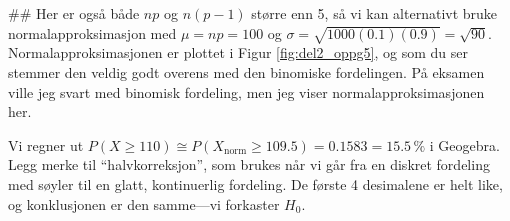 \begin{easylist}[enumerate]
	## Her er også både $np$ og $n(p-1)$ større enn 5, så vi kan alternativt bruke
	normalapproksimasjon med $\mu =np=100$ og $\sigma = \sqrt{1000 (0.1) (0.9)} = \sqrt{90}$. Normalapproksimasjonen er plottet i Figur \ref{fig:del2_oppg5}, og som du ser stemmer den veldig godt overens
	med den binomiske fordelingen.
	På eksamen ville jeg svart med binomisk fordeling, men jeg viser normalapproksimasjonen her.
	
	Vi regner ut $P(X \geq 110) \cong P(X_\text{norm} \geq 109.5) = 0.1583 = 15.5\,  \%$ i Geogebra. Legg merke til ``halvkorreksjon'', som brukes når vi går fra en diskret fordeling med søyler til en glatt, kontinuerlig fordeling. De første 4 desimalene er helt like, og konklusjonen er den samme---vi forkaster $H_0$.
	
\end{easylist}

